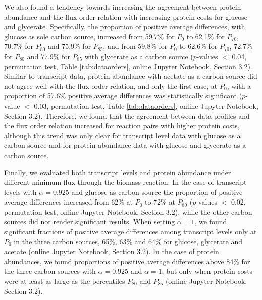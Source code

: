 \documentclass[12pt]{article}
\begin{document}
We also found a tendency towards increasing the agreement between protein abundance and the flux order relation with increasing protein costs for glucose and glycerate. Specifically, the proportion of positive average differences, with glucose as sole carbon source, increased from 59.7\% for $P_{0}$ to 62.1\% for $P_{70}$, 70.7\% for $P_{80}$ and 75.9\% for $P_{85}$, and from 59.8\% for $P_{0}$ to 62.6\% for $P_{70}$, 72.7\% for $P_{80}$ and 77.9\% for $P_{85}$ with glycerate as a carbon source ($p$-values $<$ 0.04, permutation test, Table \ref{tab:dataorders}, online Jupyter Notebook, Section 3.2). Similar to transcript data, protein abundance with acetate as a carbon source did not agree well with the flux order relation, and only the first case, at $P_{0}$, with a proportion of 57.6\% positive average differences was statistically significant ($p$-value $<$ 0.03, permutation test, Table \ref{tab:dataorders}, online Jupyter Notebook, Section 3.2). Therefore, we found that the agreement between data profiles and the flux order relation increased for reaction pairs with higher protein costs, although this trend was only clear for transcript level data with glucose as a carbon source and for protein abundance data with glucose and glycerate as a carbon source.

{\color{blue} Finally, we evaluated both transcript levels and protein abundance under different minimum flux through the biomass reaction. In the case of transcript levels with $\alpha=0.925$ and glucose as carbon source the proportion of positive average differences increased from 62\% at $P_0$ to 72\% at $P_{80}$ ($p$-values $<$ 0.02, permutation test, online Jupyter Notebook, Section 3.2), while the other carbon sources did not render significant results. When setting $\alpha = 1$, we found significant fractions of positive average differences among transcript levels only at $P_0$ in the three carbon sources, 65\%, 63\% and 64\% for glucose, glycerate and acetate (online Jupyter Notebook, Section 3.2). In the case of protein abundances, we found proportions of positive average differences above 84\% for the three carbon sources with $\alpha=0.925$ and $\alpha=1$, but only when protein costs were at least as large as the percentiles $P_{80}$ and $P_{85}$ (online Jupyter Notebook, Section 3.2).}
\end{document}
